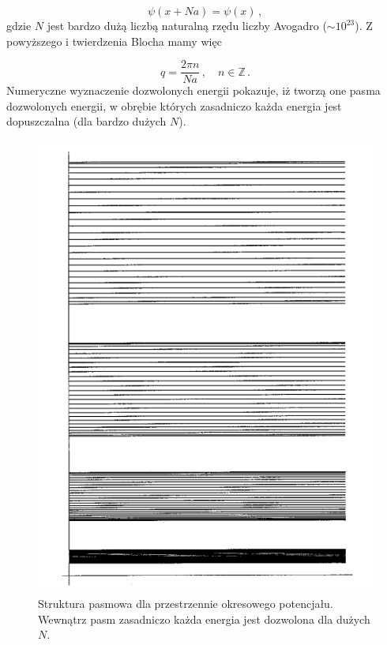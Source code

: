 \documentclass{myclass}
\begin{document}
\begin{equation*}
\psi(x+Na)=\psi(x)\,,
\end{equation*}
gdzie \(N\) jest bardzo dużą liczbą naturalną rzędu liczby Avogadro (\(\sim10^{23}\)). Z powyższego
i twierdzenia Blocha mamy więc

\begin{equation*}
q = \frac{2\pi n}{Na}\,,\quad n\in\mathbb{Z}\,.
\end{equation*}
Numeryczne wyznaczenie dozwolonych energii pokazuje, iż tworzą one pasma dozwolonych energii, w
obrębie których zasadniczo każda energia jest dopuszczalna (dla bardzo dużych \(N\)).

\begin{figure}[ht]
    \centering
    \includegraphics[scale=0.5]{diag/bands.png}
    \caption{Struktura pasmowa dla przestrzennie okresowego potencjału. Wewnątrz pasm zasadniczo każda energia jest dozwolona dla dużych \(N\).}
    \label{fig:bands}
\end{figure}
\end{document}
